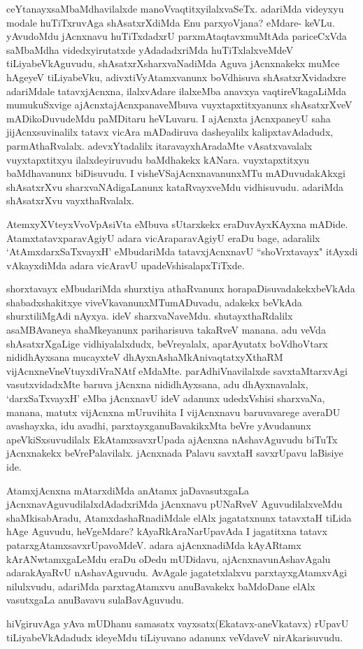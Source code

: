 \centerline{}

\begin{artha}
ceYtanayxsaMbaMdhavilalxde manoVvaqtitxyilalxvaSeTx. adariMda videyxyu
modale \-huTiTxruvAga shAsatxrXdiMda Enu parxyoVjana? eMdare-
keVLu. yAvudoMdu jAcnxnavu huTiTxdadxrU parxmAtaqtavxmuMtAda
pariceCxVda saMbaMdha videdxyirutatxde \break yAdadadxriMda huTiTxlalxveMdeV
tiLiyabeVkAguvudu, shAsatxrXsharxvaNadiMda Aguva \break jAcnxnakekx muMce
hAgeyeV tiLiyabeVku, adivxtiVyAtamxvanunx boVdhisuva shAsatxrX\-vidadxre
adariMdale tatavxjAcnxna, ilalxvAdare ilalxeMba anavxya
vaqtireVkagaLiMda mumukuSxvige ajAcnxtajAcnxpanaveMbuva
vuyxtapxtitxyanunx shAsatxrXveV mADikoDuvudeMdu paMDitaru \-heVLuvaru. I
ajAcnxta jAcnxpaneyU saha jijAcnxsuvinalilx tatavx vicAra mADadiruva
dasheyalilx kalipxtavAdadudx, parmAthaRvalalx. adevxYtadalilx
itaravayxhAradaMte vAsatxva\-valalx vuyxtapxtitxyu ilalxdeyiruvudu
baMdhakekx kANara. vuyxtapxtitxyu baMdhavanunx biDisu\-vudu. I
visheVSajAcnxnavanunxMTu mADuvudakAkxgi shAsatxrXvu
sharxvaNAdigaLanunx kataRvayx\-veMdu vidhisuvudu. adariMda shAsatxrXvu vayxthaRvalalx.  

AtemxyXVteyxVvoVpAsiVta eMbuva sUtarxkekx eraDuvAyxKAyxna
mADide. AtamxtatavxparavAgiyU adara vicAraparavAgiyU eraDu bage,
adaralilx `AtAmxdarxSaTxvayxH' eMbudariMda tatavxjAcnxnavU ``shoVrxtavayx" itAyxdi
vAkayxdiMda adara vicAravU \-upadeVshisalapxTiTxde.

shorxtavayx eMbudariMda shurxtiya athaRvanunx
horapaDisuvadakekxbeVkAda shabadx\-shakitxye viveVkavanunxMTumADuvadu,
adakekx beVkAda shurxtiliMgAdi nAyxya. ideV
sharxvaNaveMdu. shutayxthaRdalilx asaMBAvaneya shaMkeyanunx
pariharisuva takaRveV manana. adu veVda shAsatxrXgaLige
vidhiyalalxdudx, beVreyalalx, aparAyutatx \break boVdhoV\s tarx
nididhAyxsana mucayxteV dhAyxnAshaMkAnivaqtatxyXthaRM
vijAcnxneVneVtuyx\-diVraNAtf eMdaMte. parAdhiVnavilalxde savxtaMtarxvAgi
vasutxvidadxMte baruva jAcnxna nididhAyxsana, adu dhAyxnavalalx,
`darxSaTxvayxH' eMba jAcnxnavU ideV adanunx udedxVshisi sharxvaNa, manana,
matutx vijAcnxna mUruvihita I vijAcnxnavu baruvavarege averaDU
avashayxka, idu avadhi, parxtayxganuBavakikxMta beVre yAvudanunx
apeVkiSxsuvudilalx EkAtamxsavxrUpada ajAcnxna nAshavAguvudu biTuTx
jAcnxnakekx beVrePalavilalx. jAcnxnada Palavu savxtaH
savxrUpavu laBisiye ide.
\end{artha}

\begin{artha}
AtamxjAcnxna mAtarxdiMda anAtamx jaDavasutxgaLa
jAcnxnavAguvudilalxdAdadxriMda \break jAcnxnavu pUNaRveV AguvudilalxveMdu
shaMkisabAradu, AtamxdashaRnadiMdale elAlx jagatatxnunx tatavxtaH
tiLida hAge Aguvudu, heVgeMdare? kAyaRkAraNarUpavAda I jagatitxna
tatavx patarxgAtamxsavxrUpavoMdeV. adara ajAcnxnadiMda kAyARtamx
kArANwtamx\-gaLeMdu eraDu oDedu mUDidavu, ajAcnxnavunAshavAgalu
adarakAyaRvU nAshavAguvudu. AvAgale jagatetxlalxvu parxtayxgAtamxvAgi
nilulxvudu, adariMda parxtagAtamxvu anuBavakekx baMdoDane elAlx
vasutxgaLa anuBavavu sulaBavAguvudu.

hiVgiruvAga yAva mUDhanu samasatx vayxsatx(Ekatavx-aneVkatavx) rUpavU
tiLiyabeVkAdadudx ideyeMdu tiLiyuvano adanunx veVdaveV nirAkarisuvudu.
\end{artha}


